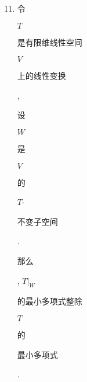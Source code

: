\documentclass[10pt]{article}
\begin{document}
\begin{enumerate}
  \setcounter{enumi}{10}
  \item \begin{CJK}{UTF8}{mj}令\end{CJK} $T$ \begin{CJK}{UTF8}{mj}是有限维线性空间\end{CJK} $V$ \begin{CJK}{UTF8}{mj}上的线性变换\end{CJK}, \begin{CJK}{UTF8}{mj}设\end{CJK} $W$ \begin{CJK}{UTF8}{mj}是\end{CJK} $V$ \begin{CJK}{UTF8}{mj}的\end{CJK} $T$-\begin{CJK}{UTF8}{mj}不变子空间\end{CJK}. \begin{CJK}{UTF8}{mj}那么\end{CJK}, $\left.T\right|_{W}$ \begin{CJK}{UTF8}{mj}的最小多项式整除\end{CJK} $T$ \begin{CJK}{UTF8}{mj}的\end{CJK} \begin{CJK}{UTF8}{mj}最小多项式\end{CJK}.
\end{enumerate}
\end{document}
